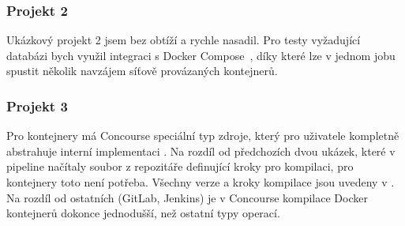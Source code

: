         \subsubsection{Projekt 2}
            Ukázkový projekt 2 jsem bez obtíží a rychle nasadil. Pro testy vyžadující databázi bych využil integraci s Docker Compose~\cite{concourse-compose}, díky které lze v jednom jobu spustit několik navzájem síťově provázaných kontejnerů.

        \subsubsection{Projekt 3}
            Pro kontejnery má Concourse speciální typ zdroje, který pro uživatele kompletně abstrahuje interní implementaci . Na rozdíl od předchozích dvou ukázek, které v pipeline načítaly soubor z repozitáře definující kroky pro kompilaci, pro kontejnery toto není potřeba. Všechny verze a kroky kompilace jsou uvedeny v . Na rozdíl od ostatních \CI (GitLab, Jenkins) je v Concourse kompilace Docker kontejnerů dokonce jednodušší, než ostatní typy operací.
